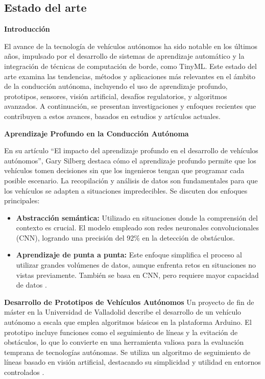 \subsection{Estado del arte} 

\textbf{Introducción}

El avance de la tecnología de vehículos autónomos ha sido notable en los últimos años, impulsado por el desarrollo de sistemas de aprendizaje automático y la integración de técnicas de computación de borde, como TinyML. Este estado del arte examina las tendencias, métodos y aplicaciones más relevantes en el ámbito de la conducción autónoma, incluyendo el uso de aprendizaje profundo, prototipos, sensores, visión artificial, desafíos regulatorios, y algoritmos avanzados. A continuación, se presentan investigaciones y enfoques recientes que contribuyen a estos avances, basados en estudios y artículos actuales.

\textbf{Aprendizaje Profundo en la Conducción Autónoma}

En su artículo “El impacto del aprendizaje profundo en el desarrollo de vehículos autónomos”, Gary Silberg destaca cómo el aprendizaje profundo permite que los vehículos tomen decisiones sin que los ingenieros tengan que programar cada posible escenario. La recopilación y análisis de datos son fundamentales para que los vehículos se adapten a situaciones impredecibles. Se discuten dos enfoques principales:
\begin{itemize}
    \item \textbf{Abstracción semántica:} Utilizado en situaciones donde la comprensión del contexto es crucial. El modelo empleado son redes neuronales convolucionales (CNN), logrando una precisión del 92\% en la detección de obstáculos.

    \item \textbf{Aprendizaje de punta a punta:} Este enfoque simplifica el proceso al utilizar grandes volúmenes de datos, aunque enfrenta retos en situaciones no vistas previamente. También se basa en CNN, pero requiere mayor capacidad de datos \cite{silberg2024}.

\end{itemize}

\textbf{ Desarrollo de Prototipos de Vehículos Autónomos}
Un proyecto de fin de máster en la Universidad de Valladolid describe el desarrollo de un vehículo autónomo a escala que emplea algoritmos básicos en la plataforma Arduino. El prototipo incluye funciones como el seguimiento de líneas y la evitación de obstáculos, lo que lo convierte en una herramienta valiosa para la evaluación temprana de tecnologías autónomas. Se utiliza un algoritmo de seguimiento de líneas basado en visión artificial, destacando su simplicidad y utilidad en entornos controlados \cite{valla2023}.


